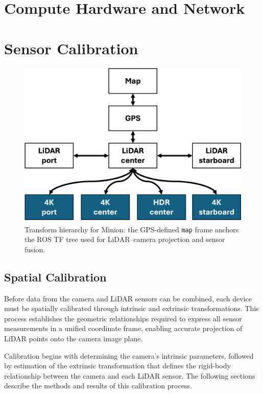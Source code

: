 \documentclass{erauthesis}
\begin{document}
\section{Compute Hardware and Network} \label{sec:Atlas_LAN}


\section{Sensor Calibration} \label{sec:calibration}


\begin{figure}[htbp]
    \centering
    \includegraphics[width=0.7\linewidth]{Images/tf_tree_1.png}
    \caption{Transform hierarchy for Minion: the GPS-defined \texttt{map} frame anchors the ROS TF tree used for LiDAR–camera projection and sensor fusion.}
    \label{fig:tf_tree}
\end{figure}

\subsection{Spatial Calibration} \label{spatial_calibration}

Before data from the camera and \ac{LiDAR} sensors can be combined, each device must be spatially calibrated through intrinsic and extrinsic transformations.  
This process establishes the geometric relationships required to express all sensor measurements in a unified coordinate frame, enabling accurate projection of \ac{LiDAR} points onto the camera image plane.

Calibration begins with determining the camera’s intrinsic parameters, followed by estimation of the extrinsic transformation that defines the rigid-body relationship between the camera and each \ac{LiDAR} sensor.  
The following sections describe the methods and results of this calibration process.
\end{document}
